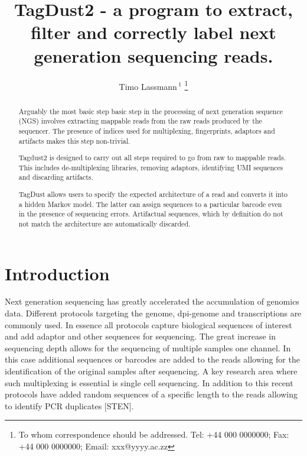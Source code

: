 \documentclass[a4,center,fleqn]{NAR}
\begin{document}
\title{TagDust2 - a program to extract, filter and correctly label next generation sequencing reads.}

\author{%
Timo Lassmann\,$^{1}$%
\footnote{To whom correspondence should be addressed.
Tel: +44 000 0000000; Fax: +44 000 0000000; Email: xxx@yyyy.ac.zz}}

\address{%
$^{1}$Division of Genomic Technologies, Center for Life Science Technologies,
RIKEN Yokohama Institute`
1-7-22 Suehiro-cho, Tsurumi-ku, Yokohama
230-0045 Kanagawa, Japan 
}


\maketitle

\begin{abstract}

Arguably the most basic step basic step in the processing of next generation sequence (NGS) involves extracting mappable reads from the raw reads produced by the sequencer. The presence of indices used for multiplexing, fingerprints, adaptors and artifacts makes this step non-trivial. 

Tagdust2 is designed to carry out all steps required to go from raw to mappable reads. This includes de-multiplexing libraries, removing adaptors, identifying UMI sequences and discarding artifacts. 

TagDust allows users to specify the expected architecture of a read and converts it into a hidden Markov model. The latter can assign sequences to a particular barcode even in the presence of sequencing errors. Artifactual sequences, which by definition do not not match the architecture are automatically discarded.

\end{abstract}

\section{Introduction}

Next generation sequencing has greatly accelerated the accumulation of genomics data. Different protocols targeting the genome, dpi-genome and transcriptions are commonly used. In essence all protocols capture biological sequences of interest and add adaptor and other sequences for sequencing. The great increase in sequencing depth allows for the sequencing of multiple samples one channel. In this case additional sequences or barcodes are added to the reads allowing for the identification of the original samples after sequencing. A key research area where such multiplexing is essential is single cell sequencing. In addition to this recent protocols have added random sequences of a specific length to the reads allowing to identify PCR duplicates [STEN]. 
\end{document}
